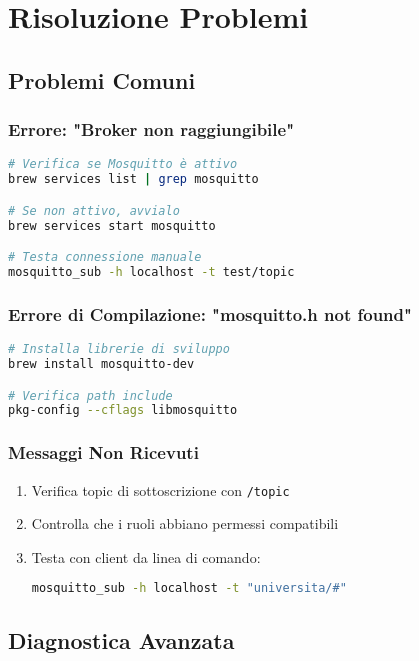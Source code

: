 \documentclass[12pt,a4paper]{article}
\begin{document}
\section{Risoluzione Problemi}

\subsection{Problemi Comuni}

\subsubsection{Errore: "Broker non raggiungibile"}
\begin{lstlisting}[language=bash]
# Verifica se Mosquitto è attivo
brew services list | grep mosquitto

# Se non attivo, avvialo
brew services start mosquitto

# Testa connessione manuale
mosquitto_sub -h localhost -t test/topic
\end{lstlisting}

\subsubsection{Errore di Compilazione: "mosquitto.h not found"}
\begin{lstlisting}[language=bash]
# Installa librerie di sviluppo
brew install mosquitto-dev

# Verifica path include
pkg-config --cflags libmosquitto
\end{lstlisting}

\subsubsection{Messaggi Non Ricevuti}
\begin{enumerate}
    \item Verifica topic di sottoscrizione con \texttt{/topic}
    \item Controlla che i ruoli abbiano permessi compatibili
    \item Testa con client da linea di comando:
    \begin{lstlisting}[language=bash]
mosquitto_sub -h localhost -t "universita/#"
    \end{lstlisting}
\end{enumerate}

\subsection{Diagnostica Avanzata}
\end{document}
